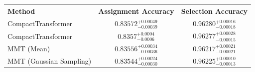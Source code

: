     \begin{tabular}{lcc}
        \toprule
        Method & Assignment Accuracy & Selection Accuracy \\
        \midrule
        CompactTransformer & $0.83572_{-0.00039}^{+0.00049}$ & $0.96280_{-0.00018}^{+0.00016}$ \\
        CompactTransformer & $0.8357_{-0.0006}^{+0.0004}$ & $0.96277_{-0.00015}^{+0.00028}$ \\
        MMT (Mean) & $0.83556_{-0.00036}^{+0.00034}$ & $0.96217_{-0.00021}^{+0.00021}$ \\
        MMT (Gaussian Sampling) & $0.83544_{-0.00030}^{+0.00024}$ & $0.96225_{-0.00013}^{+0.00010}$ \\
        \bottomrule
    \end{tabular}